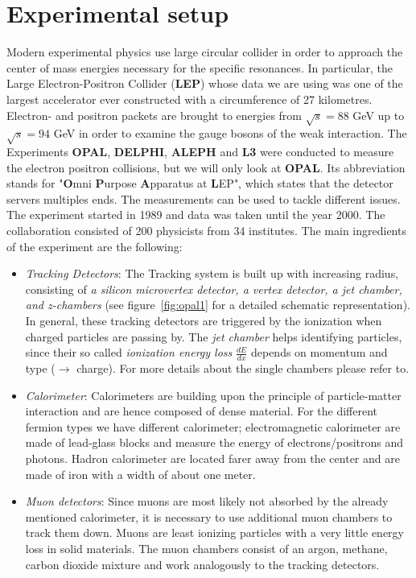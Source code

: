 \section{Experimental setup}
\label{sec:experimentalsetup}
Modern experimental physics use large circular collider in order to approach the center of mass energies necessary for the
specific resonances. In particular, the Large Electron-Positron Collider (\textbf{LEP}) whose data we are using was one
of the largest accelerator ever constructed with a circumference of 27 kilometres. Electron- and positron packets are brought
to energies from $\sqrt{s} = 88$ GeV up to $\sqrt{s} = 94$ GeV in order to examine the gauge bosons of the weak interaction. 
The Experiments \textbf{OPAL}, \textbf{DELPHI}, \textbf{ALEPH} and \textbf{L3} were conducted to measure the electron positron
collisions, but we will only look at \textbf{OPAL}. 
Its abbreviation stands for  "\textbf{O}mni \textbf{P}urpose \textbf{A}pparatus at \textbf{L}EP", which states that the
detector servers multiples ends. The measurements can be used to tackle different issues. The experiment started in
1989 and data was taken until the year 2000. The collaboration consisted of 200 physicists from 34 institutes.
The main ingredients of the experiment are the following: 
\begin{itemize}
    \item \emph{Tracking Detectors}: The Tracking system is built up with increasing radius, consisting of 
        \textit{a silicon microvertex detector, a vertex detector, a jet chamber, and z-chambers}\cite{CERN_OPAL} 
        (see figure~\ref{fig:opal1} for a detailed schematic representation). In general, these tracking detectors
    are triggered by the ionization when charged particles are passing by. 
    The \textit{jet chamber} helps identifying particles, since their so
    called \textit{ionization energy loss} $\frac{dE}{dx}$ depends on momentum and type ($\rightarrow$ charge). For
    more details about the single chambers please refer to\cite{CERN_OPAL}.
\item \emph{Calorimeter}: Calorimeters are building upon the principle of particle-matter interaction and are hence
    composed of dense material. For the different fermion types we have different calorimeter; electromagnetic calorimeter
    are made of lead-glass blocks and measure the energy of electrons/positrons and photons. Hadron calorimeter are located
    farer away from the center and are made of iron with a width of about one meter. 
\item \emph{Muon detectors}: Since muons are most likely not absorbed by the already mentioned calorimeter, it is necessary 
        to use additional muon chambers to track them down. Muons are least ionizing particles with a very little energy
        loss in solid materials. The muon chambers consist of an argon, methane, carbon dioxide mixture and work analogously to
        the tracking detectors. 
\end{itemize}
